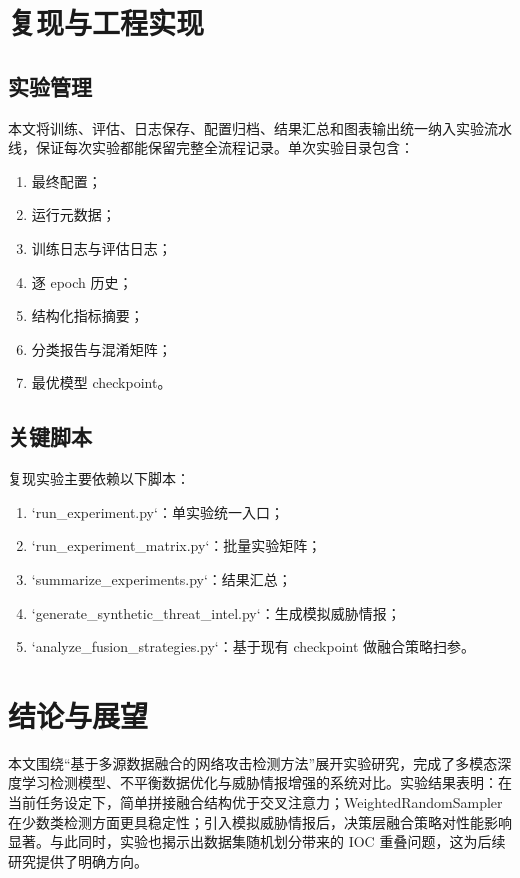 \documentclass[UTF8,a4paper,12pt]{ctexart}
\begin{document}
\section{复现与工程实现}
\subsection{实验管理}
本文将训练、评估、日志保存、配置归档、结果汇总和图表输出统一纳入实验流水线，保证每次实验都能保留完整全流程记录。单次实验目录包含：
\begin{enumerate}[leftmargin=2em]
    \item 最终配置；
    \item 运行元数据；
    \item 训练日志与评估日志；
    \item 逐 epoch 历史；
    \item 结构化指标摘要；
    \item 分类报告与混淆矩阵；
    \item 最优模型 checkpoint。
\end{enumerate}

\subsection{关键脚本}
复现实验主要依赖以下脚本：
\begin{enumerate}[leftmargin=2em]
    \item `run_experiment.py`：单实验统一入口；
    \item `run_experiment_matrix.py`：批量实验矩阵；
    \item `summarize_experiments.py`：结果汇总；
    \item `generate_synthetic_threat_intel.py`：生成模拟威胁情报；
    \item `analyze_fusion_strategies.py`：基于现有 checkpoint 做融合策略扫参。
\end{enumerate}

\section{结论与展望}
本文围绕“基于多源数据融合的网络攻击检测方法”展开实验研究，完成了多模态深度学习检测模型、不平衡数据优化与威胁情报增强的系统对比。实验结果表明：在当前任务设定下，简单拼接融合结构优于交叉注意力；WeightedRandomSampler 在少数类检测方面更具稳定性；引入模拟威胁情报后，决策层融合策略对性能影响显著。与此同时，实验也揭示出数据集随机划分带来的 IOC 重叠问题，这为后续研究提供了明确方向。
\end{document}
